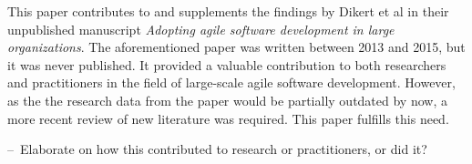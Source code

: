 This paper contributes to and supplements the findings by Dikert et
al in their unpublished manuscript \textit{Adopting agile software
development in large organizations}. The aforementioned paper was
written between 2013 and 2015, but it was never published. It provided a
valuable contribution to both researchers and practitioners in the field
of large-scale agile software development. However, as the the research
data from the paper would be partially outdated by now, a more recent
review of new literature was required. This paper fulfills this need.

– Elaborate on how this contributed to research or practitioners, or did it?
